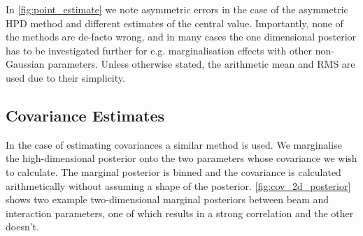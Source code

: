 In \autoref{fig:point_estimate} we note asymmetric errors in the case of the asymmetric HPD method and different estimates of the central value. Importantly, none of the methods are de-facto wrong, and in many cases the one dimensional posterior has to be investigated further for e.g. marginalisation effects with other non-Gaussian parameters. Unless otherwise stated, the arithmetic mean and RMS are used due to their simplicity.

\subsection{Covariance Estimates}
In the case of estimating covariances a similar method is used. We marginalise the high-dimensional posterior onto the two parameters whose covariance we wish to calculate. The marginal posterior is binned and the covariance is calculated arithmetically without assuming a shape of the posterior. \autoref{fig:cov_2d_posterior} shows two example two-dimensional marginal posteriors between beam and interaction parameters, one of which results in a strong correlation and the other doesn't.
